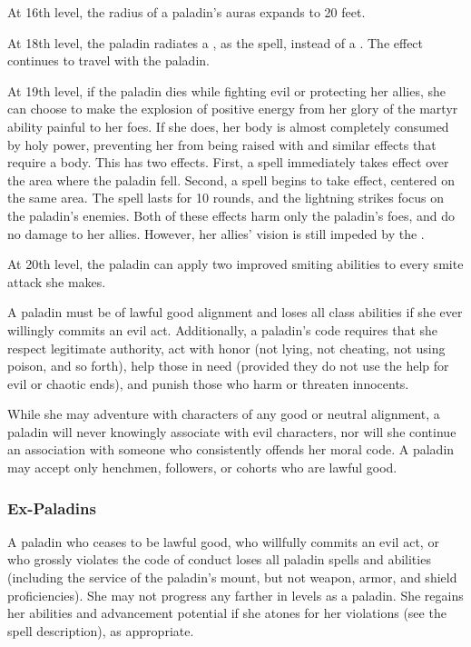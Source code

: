 At 16th level, the radius of a paladin's auras expands to 20 feet.

 At 18th level, the paladin radiates a , as the spell, instead of a . The effect continues to travel with the paladin.

 At 19th level, if the paladin dies while fighting evil or protecting her allies, she can choose to make the explosion of positive energy from her glory of the martyr ability painful to her foes. If she does, her body is almost completely consumed by holy power, preventing her from being raised with  and similar effects that require a body. This has two effects. First, a  spell immediately takes effect over the area where the paladin fell. Second, a  spell begins to take effect, centered on the same area. The spell lasts for 10 rounds, and the lightning strikes focus on the paladin's enemies. Both of these effects harm only the paladin's foes, and do no damage to her allies. However, her allies' vision is still impeded by the .

 At 20th level, the paladin can apply two improved smiting abilities to every smite attack she makes.

 A paladin must be of lawful good alignment and loses all class abilities if she ever willingly commits an evil act. Additionally, a paladin's code requires that she respect legitimate authority, act with honor (not lying, not cheating, not using poison, and so forth), help those in need (provided they do not use the help for evil or chaotic ends), and punish those who harm or threaten innocents.

 While she may adventure with characters of any good or neutral alignment, a paladin will never knowingly associate with evil characters, nor will she continue an association with someone who consistently offends her moral code. A paladin may accept only henchmen, followers, or cohorts who are lawful good.

\subsubsection{Ex-Paladins}
A paladin who ceases to be lawful good, who willfully commits an evil act, or who grossly violates the code of conduct loses all paladin spells and abilities (including the service of the paladin's mount, but not weapon, armor, and shield proficiencies). She may not progress any farther in levels as a paladin. She regains her abilities and advancement potential if she atones for her violations (see the  spell description), as appropriate.


